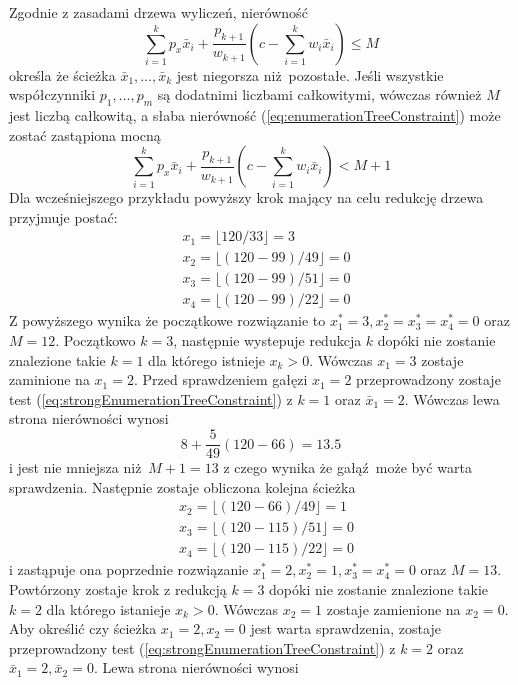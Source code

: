 Zgodnie z zasadami drzewa wyliczeń, nierówność
\begin{equation} \label{eq:enumerationTreeConstraint}
  \sum_{i=1}^k p_x\bar{x}_i + \frac{p_{k+1}}{w_{k+1}}(c - \sum_{i=1}^kw_i\bar{x}_i) \le M
\end{equation}
określa że ścieżka $\bar{x}_1, \dots, \bar{x}_k$ jest niegorsza niż pozostałe. Jeśli wszystkie współczynniki $p_1,\dots,p_m$ są dodatnimi liczbami całkowitymi, wówczas również $M$ jest liczbą całkowitą, a słaba nierówność (\ref{eq:enumerationTreeConstraint}) może zostać zastąpiona mocną
\begin{equation} \label{eq:strongEnumerationTreeConstraint}
  \sum_{i=1}^k p_x\bar{x}_i + \frac{p_{k+1}}{w_{k+1}}(c - \sum_{i=1}^kw_i\bar{x}_i) < M + 1
\end{equation}
Dla wcześniejszego przykładu powyższy krok mający na celu redukcję drzewa przyjmuje postać:
\begin{equation*}
  \begin{aligned}
    & x_1 = \lfloor120/33\rfloor = 3 \\
    & x_2 = \lfloor(120-99)/49\rfloor = 0 \\
    & x_3 = \lfloor(120-99)/51\rfloor = 0 \\
    & x_4 = \lfloor(120-99)/22\rfloor = 0
  \end{aligned}
\end{equation*}
Z powyższego wynika że początkowe rozwiązanie to $x_1^* = 3, x_2^*=x_3^*=x_4^*=0$ oraz $M = 12$. Początkowo $k=3$, następnie wystepuje redukcja $k$ dopóki nie zostanie znalezione takie $k=1$ dla którego istnieje $x_k > 0$. Wówczas $x_1=3$ zostaje zaminione na $x_1=2$. Przed sprawdzeniem gałęzi $x_1=2$ przeprowadzony zostaje test (\ref{eq:strongEnumerationTreeConstraint}) z $k=1$ oraz $\bar{x}_1 = 2$.
Wówczas lewa strona nierówności wynosi
\begin{equation*}
  8 + \frac{5}{49}(120-66) = 13.5
\end{equation*}
i jest nie mniejsza niż $M + 1 = 13$ z czego wynika że gałąź może być warta sprawdzenia.
Następnie zostaje obliczona kolejna ścieżka
\begin{equation*}
  \begin{aligned}
    & x_2 = \lfloor(120-66)/49\rfloor = 1 \\
    & x_3 = \lfloor(120-115)/51\rfloor = 0 \\
    & x_4 = \lfloor(120-115)/22\rfloor = 0
  \end{aligned}
\end{equation*}
i zastąpuje ona poprzednie rozwiązanie $x_1^* = 2, x_2^*=1, x_3^*=x_4^*=0$ oraz $M = 13$. Powtórzony zostaje krok z redukcją $k=3$ dopóki nie zostanie znalezione takie $k=2$ dla którego istanieje $x_k>0$. Wówczas $x_2=1$ zostaje zamienione na $x_2=0$. Aby określić czy ścieżka $x_1=2, x_2=0$ jest warta sprawdzenia, zostaje przeprowadzony test (\ref{eq:strongEnumerationTreeConstraint}) z $k=2$ oraz $\bar{x}_1 = 2, \bar{x}_2 = 0$. Lewa strona nierówności wynosi
